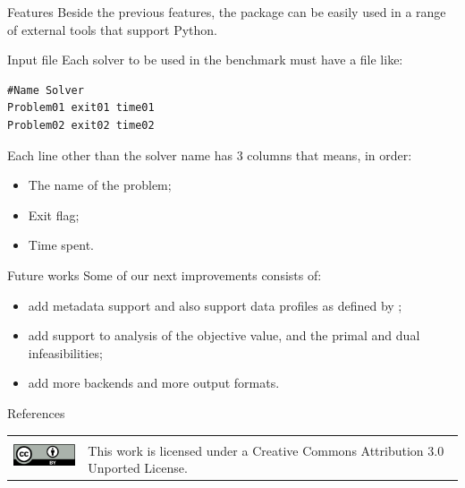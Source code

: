 \documentclass[a0paper,portrait]{baposter}
\begin{document}
\begin{poster}
\begin{posterbox}[column=1]{Features}
    Beside the previous features, the package can be easily used in a range
    of external tools that support Python.
  \end{posterbox}

  \begin{posterbox}[column=1,below=auto]{Input file}
    Each solver to be used in the benchmark must have a file like:

    \begin{lstlisting}
#Name Solver
Problem01 exit01 time01
Problem02 exit02 time02
    \end{lstlisting}

    Each line other than the solver name has 3 columns that means, in order:
    \begin{itemize}[noitemsep]
      \item The name of the problem;
      \item Exit flag;
      \item Time spent.
    \end{itemize}
  \end{posterbox}

  \begin{posterbox}[column=1,below=auto]{Future works}
    Some of our next improvements consists of:
    \begin{itemize}[noitemsep]
      \item add metadata support and also support data profiles as defined by
        \textcite{More2009};
      \item add support to analysis of the objective value, and the primal and
        dual infeasibilities;
      \item add more backends and more output formats.
    \end{itemize}
  \end{posterbox}

  \begin{posterbox}[column=1,below=auto]{References}
    \printbibliography[heading=none]
  \end{posterbox}

  \begin{posterbox}[column=0,span=2,below=auto,height=bottom,
    boxshade=none,textborder=none,headerborder=none,headershade=plain,
  headerColorOne=bgcolor2, boxheaderheight=0cm]{}
  \begin{center}
    \begin{tabular}{cl}
      \multirow{3}{*}{\includegraphics[height=24pt]{figures/cc-by}} & \\
                                                                    & \Large
      This work is licensed under a
       Creative Commons Attribution 3.0 Unported License.
    \end{tabular}
  \end{center}
  \end{posterbox}
\end{poster}
\end{document}
